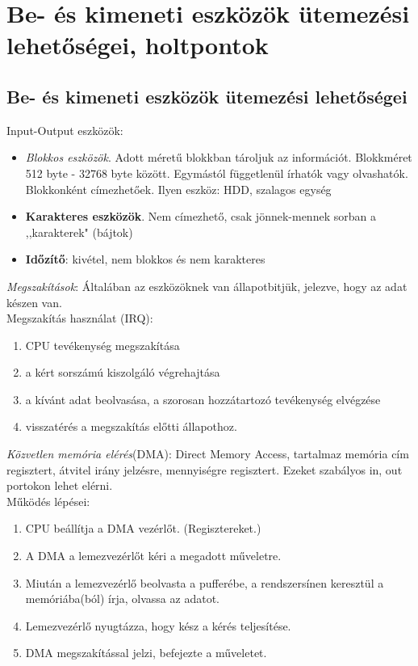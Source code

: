 \documentclass[margin=0px]{article}
\begin{document}
	\section{Be- és kimeneti eszközök ütemezési lehetőségei, holtpontok}
	
	\subsection{Be- és kimeneti eszközök ütemezési lehetőségei}
	
	Input-Output eszközök:
	\begin{itemize}
		\item \textit{Blokkos eszközök}. Adott méretű blokkban tároljuk az információt. Blokkméret 512 byte - 32768 byte között. Egymástól függetlenül írhatók vagy olvashatók. Blokkonként címezhetőek. Ilyen eszköz: HDD, szalagos egység
		\item \textbf{Karakteres eszközök}. Nem címezhető, csak jönnek-mennek sorban a
		,,karakterek" (bájtok)
		\item \textbf{Időzítő}: kivétel, nem blokkos és nem
		karakteres
	\end{itemize}
	\textit{Megszakítások}: Általában az eszközöknek van állapotbitjük, jelezve, hogy az adat készen van. \\
	Megszakítás használat (IRQ):
	\begin{enumerate}
		\item CPU tevékenység megszakítása
		\item a kért sorszámú kiszolgáló végrehajtása
		\item a kívánt adat beolvasása, a szorosan hozzátartozó tevékenység elvégzése
		\item visszatérés a megszakítás előtti állapothoz.
	\end{enumerate} 
	\textit{Közvetlen memória elérés}(DMA): Direct Memory Access, tartalmaz memória cím regisztert, átvitel irány jelzésre, mennyiségre regisztert. Ezeket szabályos in, out portokon lehet elérni. \\
	Működés lépései:
	\begin{enumerate}
		\item CPU beállítja a DMA vezérlőt. (Regisztereket.)
		\item A DMA a lemezvezérlőt kéri a megadott műveletre.
		\item Miután a lemezvezérlő beolvasta a pufferébe, a rendszersínen keresztül a memóriába(ból) írja, olvassa az adatot.
		\item Lemezvezérlő nyugtázza, hogy kész a kérés teljesítése.
		\item DMA megszakítással jelzi, befejezte a műveletet.
	\end{enumerate}
	
\end{document}
